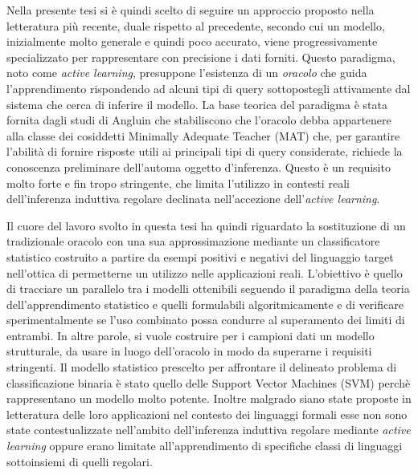 Nella presente tesi si è quindi scelto di seguire un approccio proposto nella letteratura più recente, duale rispetto al precedente, secondo cui un modello, inizialmente molto generale e quindi poco accurato, viene progressivamente specializzato per rappresentare con precisione i dati forniti. Questo paradigma, noto come \textit{active learning}, presuppone l'esistenza di un \textit{oracolo} che guida l'apprendimento rispondendo ad alcuni tipi di query sottopostegli attivamente dal sistema che cerca di inferire il modello. La base teorica del paradigma è stata fornita dagli studi di Angluin \cite{Angluin87} che stabiliscono che l'oracolo debba appartenere alla classe dei cosiddetti Minimally Adequate Teacher (MAT) che, per garantire l'abilità di fornire risposte utili ai principali tipi di query considerate, richiede la conoscenza preliminare dell'automa oggetto d'inferenza.
Questo è un requisito molto forte e fin tropo stringente, che limita l'utilizzo in contesti reali dell'inferenza induttiva regolare declinata nell'accezione dell'\textit{active learning}.
 

Il cuore del lavoro svolto in questa tesi ha quindi riguardato la sostituzione di un tradizionale oracolo con una sua approssimazione mediante un classificatore statistico costruito a partire da esempi positivi e negativi del linguaggio target nell'ottica di permetterne un utilizzo nelle applicazioni reali. L'obiettivo è quello di tracciare un parallelo tra i modelli ottenibili seguendo il paradigma della teoria dell'apprendimento statistico e quelli formulabili algoritmicamente e di verificare sperimentalmente se l'uso combinato possa condurre al superamento dei limiti di entrambi. In altre parole, si vuole costruire per i campioni dati un modello strutturale, da usare in luogo dell'oracolo in modo da superarne i requisiti stringenti.  Il modello statistico prescelto per affrontare il delineato problema di classificazione binaria è stato quello delle Support Vector Machines (SVM) perchè rappresentano un modello molto potente. Inoltre malgrado siano state proposte in letteratura delle loro applicazioni nel contesto dei linguaggi formali esse non sono state contestualizzate nell’ambito dell’inferenza induttiva regolare mediante \textit{active learning} oppure erano limitate all'apprendimento di specifiche classi di linguaggi sottoinsiemi di quelli regolari.


